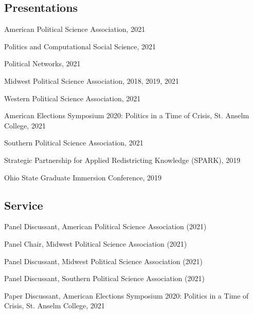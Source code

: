 \documentclass[letterpaper]{article}
\renewenvironment{itemize}{
  \begin{list}{}{
    \setlength{\leftmargin}{1.5em}
  }
}{
  \end{list}
}
\begin{document}
\subsection*{Presentations}
\begin{itemize}

\item American Political Science Association, 2021

\item Politics and Computational Social Science, 2021

\item Political Networks, 2021

\item Midwest Political Science Association, 2018, 2019, 2021

\item Western Political Science Association, 2021

\item American Elections Symposium 2020: Politics in a Time of Crisis, St. Anselm College, 2021

\item Southern Political Science Association, 2021

\item Strategic Partnership for Applied Redistricting Knowledge (SPARK), 2019

\item Ohio State Graduate Immersion Conference, 2019
\end{itemize}

\subsection*{Service}
\begin{itemize}

\item Panel Discussant, American Political Science Association (2021)

\item Panel Chair, Midwest Political Science Association (2021)

\item Panel Discussant, Midwest Political Science Association (2021)

\item Panel Discussant, Southern Political Science Association (2021)

\item Paper Discussant, American Elections Symposium 2020: Politics in a Time of Crisis, St. Anselm College, 2021

\end{itemize}
\end{document}
